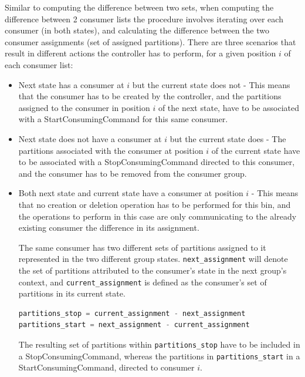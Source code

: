 Similar to computing the difference between two sets, when computing the
difference between 2 consumer lists the procedure involves iterating over each
consumer (in both states), and calculating the difference between the two consumer
assignments (set of assigned partitions). There are three scenarios that result
in different actions the controller has to perform, for a given position $i$ of
each consumer list: 
\begin{itemize} 
    \item Next state has a consumer at $i$ but the current state does not - This
        means that the consumer has to be created by the controller, and the
        partitions assigned to the consumer in position $i$ of the next state,
        have to be associated with a StartConsumingCommand for this same
        consumer.  
    \item Next state does not have a consumer at $i$ but the current state
        does - The partitions associated with the consumer at position $i$ of
        the current state have to be associated with a StopConsumingCommand
        directed to this consumer, and the consumer has to be removed from the
        consumer group.  
    \item Both next state and current state have a consumer at position $i$ -
        This means that no creation or deletion operation has to be performed
        for this bin, and the operations to perform in this case are only
        communicating to the already existing consumer the difference in its
        assignment. 
    
        The same consumer has two different sets of partitions assigned to it
        represented in the two different group states.
        \lstinline[language=Python]{next_assignment} will denote the set of
        partitions attributed to the consumer's state in the next group's
        context, and \lstinline[language=Python]{current_assignment} is defined
        as the consumer's set of partitions in its current state.
    
\begin{lstlisting}[language=Python] 
partitions_stop = current_assignment - next_assignment 
partitions_start = next_assignment - current_assignment
\end{lstlisting} 
        The resulting set of partitions within \lstinline{partitions_stop} have
        to be included in a StopConsumingCommand, whereas the partitions in
        \lstinline{partitions_start} in a StartConsumingCommand, directed to
        consumer $i$.
\end{itemize}

